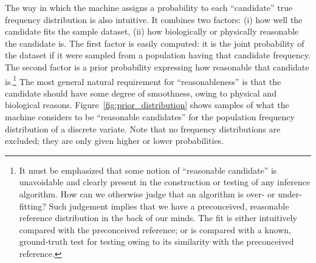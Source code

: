 \documentclass[utf8]{FrontiersinHarvard} %
\renewcommand*{\|}[1][]{\nonscript\:#1\vert\nonscript\:\mathopen{}}
\begin{document}
The way in which the machine assigns a probability to each \enquote{candidate} true frequency distribution is also intuitive. It combines two factors: (i) how well the candidate fits the sample dataset, (ii) how biologically or physically reasonable the candidate is. The first factor is easily computed: it is the joint probability of the dataset if it were sampled from a population having that candidate frequency. The second factor is a prior probability expressing how reasonable that candidate is.\footnote{It must be emphasized that some notion of \enquote{reasonable candidate} is unavoidable and clearly present in the construction or testing of any inference algorithm. How can we otherwise judge that an algorithm is over- or under-fitting? Such judgement implies that we have a preconceived, reasonable reference distribution in the back of our minds. The fit is either intuitively compared with the preconceived reference; or is compared with a known, ground-truth test for testing owing to its similarity with the preconceived reference.} The most general natural requirement for \enquote{reasonableness} is that the candidate should have some degree of smoothness, owing to physical and biological reasons. Figure~\ref{fig:prior_distribution} shows samples of what the machine considers to be \enquote{reasonable candidates} for the population frequency distribution of a discrete variate. Note that no frequency distributions are excluded; they are only given higher or lower probabilities.
\end{document}
